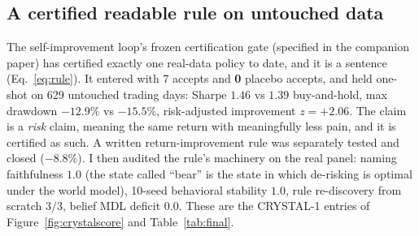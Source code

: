 \documentclass[11pt]{article}
\begin{document}
\subsection{A certified readable rule on untouched data}
\label{sec:cert}

The self-improvement loop's frozen certification gate (specified in the companion paper) has
certified exactly one real-data policy to date, and it is a sentence (Eq.~\ref{eq:rule}). It
entered with 7 accepts and \textbf{0} placebo accepts, and held one-shot on 629 untouched
trading days: Sharpe $1.46$ vs $1.39$ buy-and-hold, max drawdown $-12.9\%$ vs $-15.5\%$,
risk-adjusted improvement $z = +2.06$. The claim is a \emph{risk} claim, meaning the same return
with meaningfully less pain, and it is certified as such. A written return-improvement rule was
separately tested and closed ($-8.8\%$). I then audited the rule's machinery on the real panel:
naming faithfulness $1.0$ (the state called ``bear'' is the state in which de-risking is optimal
under the world model), 10-seed behavioral stability $1.0$, rule re-discovery from scratch $3/3$,
belief MDL deficit $0.0$. These are the CRYSTAL-1 entries of Figure~\ref{fig:crystalscore} and
Table~\ref{tab:final}.
\end{document}
